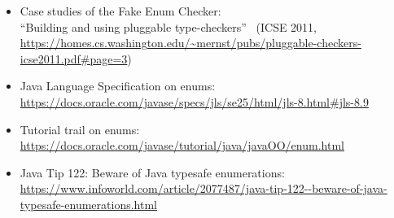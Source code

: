 
\begin{itemize}
\item Case studies of the Fake Enum Checker:\\
  ``Building and using pluggable type-checkers''~\cite{DietlDEMS2011}
  (ICSE 2011, \url{https://homes.cs.washington.edu/~mernst/pubs/pluggable-checkers-icse2011.pdf#page=3})

\item Java Language Specification on enums:\\
  \url{https://docs.oracle.com/javase/specs/jls/se25/html/jls-8.html#jls-8.9}

\item Tutorial trail on enums:\\
  \url{https://docs.oracle.com/javase/tutorial/java/javaOO/enum.html}

\item Java Tip 122: Beware of Java typesafe enumerations:\\
  \url{https://www.infoworld.com/article/2077487/java-tip-122--beware-of-java-typesafe-enumerations.html}

\end{itemize}

